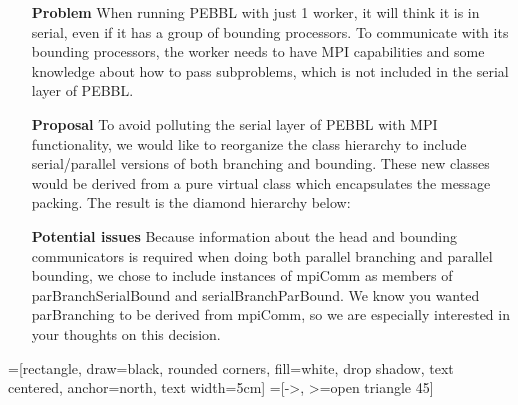\documentclass{article}
\begin{document}
\begin{enumerate}
\item[\textbf{Problem}] When running PEBBL with just 1 worker, it will think it is in serial,
even if it has a group of bounding processors. To communicate with its bounding processors, the
worker needs to have MPI capabilities and some knowledge about how to pass subproblems, which is
not included in the serial layer of PEBBL. 

\item[\textbf{Proposal}] To avoid polluting the serial layer of PEBBL with MPI functionality, we
would like to reorganize the class hierarchy to include serial/parallel versions of both branching
and bounding. These new classes would be derived from a pure virtual class which encapsulates the
message packing. The result is the diamond hierarchy below:

\item[\textbf{Potential issues}] Because information about the head and bounding communicators is
required when doing both parallel branching and parallel bounding, we chose to include instances of
mpiComm as members of parBranchSerialBound and serialBranchParBound. We know you wanted parBranching
to be derived from mpiComm, so we are especially interested in your thoughts on this decision.

\end{enumerate}

\bigskip\bigskip

=[rectangle, draw=black, rounded corners, fill=white, drop shadow,
        text centered, anchor=north, text width=5cm]
=[->, >=open triangle 45]
\end{document}
